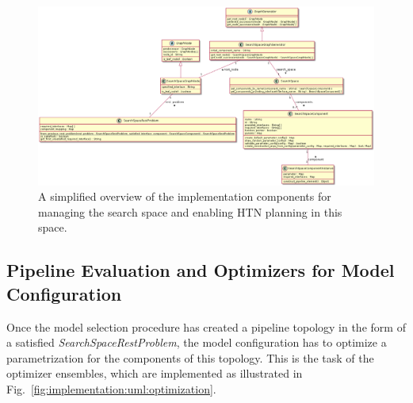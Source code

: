 \begin{figure}[ht!]
    \centering
    \includegraphics[angle=90,origin=c,width=\textwidth,height=0.7\textheight,keepaspectratio]{gfx/Figures/Implementation/search-space/SearchSpaceManagement.png}
    \caption{A simplified overview of the implementation components for managing the search space and enabling HTN planning in this space.}
    \label{fig:implementation:uml:search-space}
\end{figure}

\subsection{Pipeline Evaluation and Optimizers for Model Configuration}
\label{sec:implementation:components:optimization}
Once the model selection procedure has created a pipeline topology in the form of a satisfied \textit{SearchSpaceRestProblem}, the model configuration has to optimize a parametrization for the components of this topology.
This is the task of the optimizer ensembles, which are implemented as illustrated in Fig.~\ref{fig:implementation:uml:optimization}.

